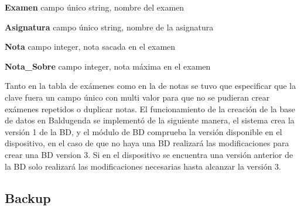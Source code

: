 \textbf{Examen} campo único string, nombre del examen

\textbf{Asignatura} campo único string, nombre de la asignatura

\textbf{Nota} campo integer, nota sacada en el examen

\textbf{Nota\_Sobre} campo integer, nota máxima en el examen


Tanto en la tabla de exámenes como en la de notas se tuvo que especificar que la clave fuera un campo único con multi valor para que no se pudieran crear exámenes repetidos o duplicar notas.
El funcionamiento de la creación de la base de datos en Baldugenda se implementó de la siguiente manera, el sistema crea la versión 1 de la BD, y el módulo de BD comprueba la versión disponible en el dispositivo, en el caso de que no haya una BD realizará las modificaciones para crear una BD version 3. Si en el dispositivo se encuentra una versión anterior de la BD solo realizará las modificaciones necesarias hasta alcanzar la versión 3.


\subsection{Backup}
\label{subsecc:Backup}

